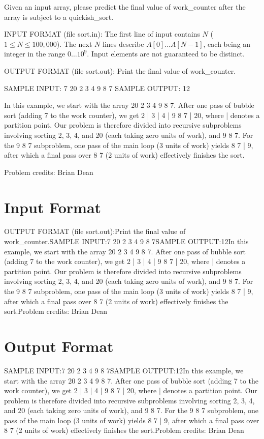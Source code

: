 \documentclass[12pt]{article}
\begin{document}
Given an input array, please predict the final value of work_counter after the 
array is subject to a quickish_sort.

INPUT FORMAT (file sort.in):
The first line of input contains $N$ ($1 \leq N \leq 100,000$).  The next $N$
lines  describe $A[0] \ldots A[N-1]$, each being an integer in the range
$0 \ldots 10^9$. Input elements are not guaranteed to be distinct.

OUTPUT FORMAT (file sort.out):
Print the final value of work_counter.

SAMPLE INPUT:
7
20
2
3
4
9
8
7
SAMPLE OUTPUT: 
12

In this example, we start with the array 20 2 3 4 9 8 7.  After one pass of
bubble sort (adding 7 to the work counter), we get 2 | 3 | 4 | 9 8 7 | 20, where |
denotes a  partition point.  Our problem is therefore divided into recursive
subproblems involving sorting 2, 3, 4, and 20 (each taking zero
units of work), and 9 8 7.  For the 9 8 7 subproblem, one pass of the main loop
(3 units of work) yields 8 7 | 9, after which a final pass over 8 7 (2 units of
work) effectively finishes the sort.


Problem credits: Brian Dean



\section*{Input Format}
OUTPUT FORMAT (file sort.out):Print the final value of work_counter.SAMPLE INPUT:7
20
2
3
4
9
8
7SAMPLE OUTPUT:12In this example, we start with the array 20 2 3 4 9 8 7.  After one pass of
bubble sort (adding 7 to the work counter), we get 2 | 3 | 4 | 9 8 7 | 20, where |
denotes a  partition point.  Our problem is therefore divided into recursive
subproblems involving sorting 2, 3, 4, and 20 (each taking zero
units of work), and 9 8 7.  For the 9 8 7 subproblem, one pass of the main loop
(3 units of work) yields 8 7 | 9, after which a final pass over 8 7 (2 units of
work) effectively finishes the sort.Problem credits: Brian Dean

\section*{Output Format}
SAMPLE INPUT:7
20
2
3
4
9
8
7SAMPLE OUTPUT:12In this example, we start with the array 20 2 3 4 9 8 7.  After one pass of
bubble sort (adding 7 to the work counter), we get 2 | 3 | 4 | 9 8 7 | 20, where |
denotes a  partition point.  Our problem is therefore divided into recursive
subproblems involving sorting 2, 3, 4, and 20 (each taking zero
units of work), and 9 8 7.  For the 9 8 7 subproblem, one pass of the main loop
(3 units of work) yields 8 7 | 9, after which a final pass over 8 7 (2 units of
work) effectively finishes the sort.Problem credits: Brian Dean
\end{document}
